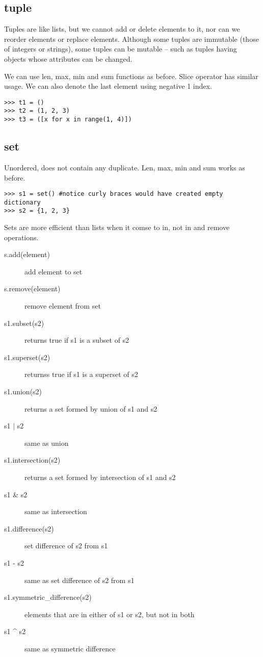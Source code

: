 \documentclass[a4paper, 12pt]{article}
\begin{document}
\subsection{tuple}
Tuples are like lists, but we cannot add or delete elements to it, nor can we reorder elements or replace elements. Although some tuples are immutable (those of integers or strings), some tuples can be mutable -- such as tuples having objects whose attributes can be changed.

We can use len, max, min and sum functions as before. Slice operator has similar usage. We can also denote the last element using negative 1 index.
\begin{verbatim}
>>> t1 = ()
>>> t2 = (1, 2, 3)
>>> t3 = ([x for x in range(1, 4)])
\end{verbatim}

\subsection{set}
Unordered, does not contain any duplicate. Len, max, min and sum works as before.

\begin{verbatim}
>>> s1 = set() #notice curly braces would have created empty dictionary
>>> s2 = {1, 2, 3}
\end{verbatim}

Sets are more efficient than lists when it comse to in, not in and remove operations.
\begin{description}
\item[s.add(element)] add element to set
\item[s.remove(element)] remove element from set
\item[s1.subset(s2)] returns true if s1 is a subset of s2
\item[s1.superset(s2)] returnss true if s1 is a superset of s2
\item[s1.union(s2)] returns a set formed by union of s1 and s2
\item[s1 $\vert$ s2] same as union
\item[s1.intersection(s2)] returns a set formed by intersection of s1 and s2
\item[s1 \& s2] same as intersection
\item[s1.difference(s2)] set difference of s2 from s1
\item[s1 - s2] same as set difference of s2 from s1
\item[s1.symmetric\_difference(s2)] elements that are in either of s1 or s2, but not in both
\item[s1 \^{} s2] same as symmetric difference
\end{description}
\end{document}
